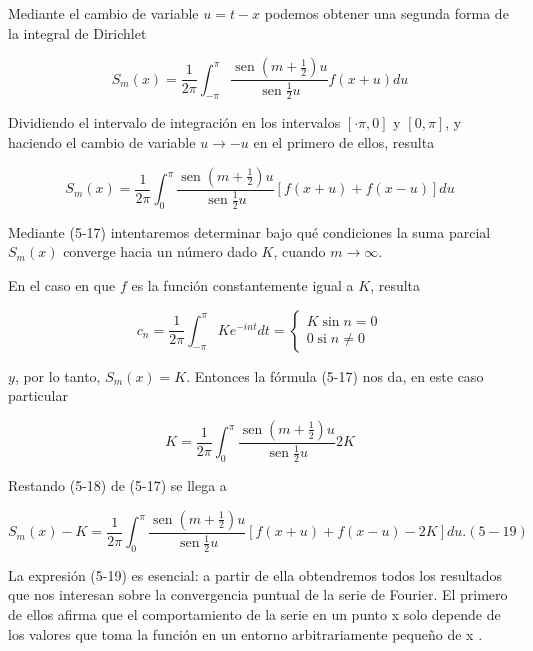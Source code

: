 \documentclass[10pt]{article}
\theoremstyle{plain}
\theoremstyle{definition}
\theoremstyle{remark}
\begin{document}
Mediante el cambio de variable $u=t-x$ podemos obtener una segunda forma de la integral de Dirichlet


\begin{equation*}
S_{m}(x)=\frac{1}{2 \pi} \int_{-\pi}^{\pi} \frac{\operatorname{sen}\left(m+\frac{1}{2}\right) u}{\operatorname{sen} \frac{1}{2} u} f(x+u) d u \tag{5-16}
\end{equation*}


Dividiendo el intervalo de integración en los intervalos $[\cdot \pi, 0]$ y $[0, \pi]$, y haciendo el cambio de variable $u \rightarrow-u$ en el primero de ellos, resulta


\begin{equation*}
S_{m}(x)=\frac{1}{2 \pi} \int_{0}^{\pi} \frac{\operatorname{sen}\left(m+\frac{1}{2}\right) u}{\operatorname{sen} \frac{1}{2} u}[f(x+u)+f(x-u)] d u \tag{5-17}
\end{equation*}


Mediante (5-17) intentaremos determinar bajo qué condiciones la suma parcial $S_{m}(x)$ converge hacia un número dado $K$, cuando $m \rightarrow \infty$.

En el caso en que $f$ es la función constantemente igual a $K$, resulta

$$
c_{n}=\frac{1}{2 \pi} \int_{-\pi}^{\pi} K e^{-i n t} d t=\left\{\begin{array}{l}
K \sin n=0 \\
0 \operatorname{si} n \neq 0
\end{array}\right.
$$

$y$, por lo tanto, $S_{m}(x)=K$. Entonces la fórmula (5-17) nos da, en este caso particular


\begin{equation*}
K=\frac{1}{2 \pi} \int_{0}^{\pi} \frac{\operatorname{sen}\left(m+\frac{1}{2}\right) u}{\operatorname{sen} \frac{1}{2} u} 2 K \tag{5•18}
\end{equation*}


Restando (5-18) de (5-17) se llega a

$$
S_{m}(x)-K=\frac{1}{2 \pi} \int_{0}^{\pi} \frac{\operatorname{sen}\left(m+\frac{1}{2}\right) u}{\operatorname{sen} \frac{1}{2} u}[f(x+u)+f(x-u)-2 K] d u .(5-19)
$$

La expresión (5-19) es esencial: a partir de ella obtendremos todos los resultados que nos interesan sobre la convergencia puntual de la serie de Fourier. El primero de ellos afirma que el comportamiento de la serie en un punto x solo depende de los valores que toma la función en un entorno arbitrariamente pequeño de x .
\end{document}
